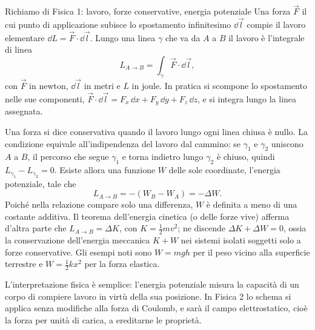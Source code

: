 \documentclass[main.tex]{subfiles}
\begin{document}
	\begin{riquadro}{Richiamo di Fisica 1: lavoro, forze conservative, energia potenziale}
		Una forza $\vec F$ il cui punto di applicazione subisce lo spostamento infinitesimo $\dd\vec l$ compie il lavoro elementare $\dd L=\vec F\cdot\dd\vec l$. Lungo una linea $\gamma$ che va da $A$ a $B$ il lavoro è l'integrale di linea
		\[
		L_{A\to B}=\int_{\gamma}\vec F\cdot\dd\vec l ,
		\]
		con $\vec F$ in newton, $\dd\vec l$ in metri e $L$ in joule. In pratica si scompone lo spostamento nelle sue componenti, $\vec F\cdot\dd\vec l=F_x\,\dd x+F_y\,\dd y+F_z\,\dd z$, e si integra lungo la linea assegnata.
		
		Una forza si dice conservativa quando il lavoro lungo ogni linea chiusa è nullo. La condizione equivale all'indipendenza del lavoro dal cammino: se $\gamma_1$ e $\gamma_2$ uniscono $A$ a $B$, il percorso che segue $\gamma_1$ e torna indietro lungo $\gamma_2$ è chiuso, quindi $L_{\gamma_1}-L_{\gamma_2}=0$. Esiste allora una funzione $W$ delle sole coordinate, l'energia potenziale, tale che
		\[
		L_{A\to B}=-(W_B-W_A)=-\Delta W .
		\]
		Poiché nella relazione compare solo una differenza, $W$ è definita a meno di una costante additiva. Il teorema dell'energia cinetica (o delle forze vive) afferma d'altra parte che $L_{A\to B}=\Delta K$, con $K=\tfrac12mv^2$; ne discende $\Delta K+\Delta W=0$, ossia la conservazione dell'energia meccanica $K+W$ nei sistemi isolati soggetti solo a forze conservative. Gli esempi noti sono $W=mgh$ per il peso vicino alla superficie terrestre e $W=\tfrac12kx^2$ per la forza elastica.
		
		L'interpretazione fisica è semplice: l'energia potenziale misura la capacità di un corpo di compiere lavoro in virtù della sua posizione. In Fisica 2 lo schema si applica senza modifiche alla forza di Coulomb, e sarà il campo elettrostatico, cioè la forza per unità di carica, a ereditarne le proprietà.
	\end{riquadro}
	
\end{document}
